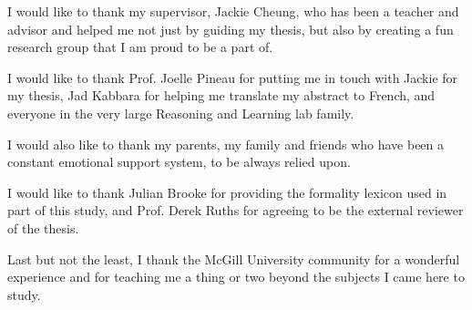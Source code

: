 \begin{acknowledgements}

I would like to thank my supervisor, Jackie Cheung, who has been a teacher and advisor and helped me not just by guiding my thesis, but also by creating a fun research group that I am proud to be a part of.

I would like to thank Prof. Joelle Pineau for putting me in touch with Jackie for my thesis, Jad Kabbara for helping me translate my abstract to French, and everyone in the very large Reasoning and Learning lab family.

I would also like to thank my parents, my family and friends who have been a constant emotional support system, to be always relied upon.

I would like to thank Julian Brooke for providing the formality lexicon used in part of this study, and Prof. Derek Ruths for agreeing to be the external reviewer of the thesis.

Last but not the least, I thank the McGill University community for a wonderful experience and for teaching me a thing or two beyond the subjects I came here to study.  
\end{acknowledgements}